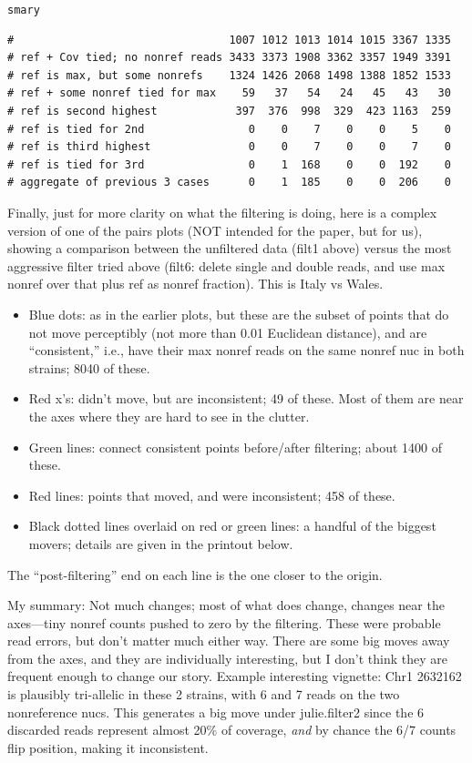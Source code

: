 \documentclass{article}\usepackage[]{graphicx}\usepackage[]{color}
\makeatletter
\newcommand{\hlstd}[1]{\textcolor[rgb]{0.345,0.345,0.345}{#1}}%
\newenvironment{kframe}{%
 \def\at@end@of@kframe{}%
 \ifinner\ifhmode%
  \def\at@end@of@kframe{\end{minipage}}%
  \begin{minipage}{\columnwidth}%
 \fi\fi%
 \def\FrameCommand##1{\hskip\@totalleftmargin \hskip-\fboxsep
 \colorbox{shadecolor}{##1}\hskip-\fboxsep
     \hskip-\linewidth \hskip-\@totalleftmargin \hskip\columnwidth}%
 \MakeFramed {\advance\hsize-\width
   \@totalleftmargin\z@ \linewidth\hsize
   \@setminipage}}%
 {\par\unskip\endMakeFramed%
 \at@end@of@kframe}
\newenvironment{knitrout}{}{} %
\makeatother
\begin{document}
\begin{knitrout}
\begin{kframe}
\begin{alltt}
\hlstd{smary}
\end{alltt}
\begin{verbatim}
#                                 1007 1012 1013 1014 1015 3367 1335
# ref + Cov tied; no nonref reads 3433 3373 1908 3362 3357 1949 3391
# ref is max, but some nonrefs    1324 1426 2068 1498 1388 1852 1533
# ref + some nonref tied for max    59   37   54   24   45   43   30
# ref is second highest            397  376  998  329  423 1163  259
# ref is tied for 2nd                0    0    7    0    0    5    0
# ref is third highest               0    0    7    0    0    7    0
# ref is tied for 3rd                0    1  168    0    0  192    0
# aggregate of previous 3 cases      0    1  185    0    0  206    0
\end{verbatim}
\end{kframe}
\end{knitrout}


Finally, just for more clarity on what the filtering is doing, here is a complex version of one of the pairs plots (NOT intended for the paper, but for us), showing a comparison between the unfiltered data (filt1 above) versus the most aggressive filter tried above (filt6: delete single and double reads, and use max nonref over that plus ref as nonref fraction).  This is Italy vs Wales.  
\begin{itemize}
  \item Blue dots: as in the earlier plots, but these are the subset of points that do not move perceptibly (not more than 0.01 Euclidean distance), and are ``consistent,'' i.e., have their max nonref reads on the same nonref nuc in both strains; 8040 of these.  
  \item Red x's: didn't move, but are inconsistent; 49 of these.  Most of them are near the axes where they are hard to see in the clutter.  
  \item Green lines: connect consistent points before/after filtering; about 1400 of these.  
  \item Red lines: points that moved, and were inconsistent; 458 of these.  
  \item Black dotted lines overlaid on red or green lines: a handful of the biggest movers; details are given in the printout below.
\end{itemize}
The ``post-filtering'' end on each line is the one closer to the origin.  

My summary: Not much changes; most of what does change, changes near the axes---tiny nonref counts pushed to zero by the filtering.  These were probable read errors, but don't matter much either way.  There are some big moves away from the axes, and they are individually interesting, but I don't think they are frequent enough to change our story.  Example interesting vignette: Chr1 2632162 is plausibly tri-allelic in these 2 strains, with 6 and 7 reads on the two nonreference nucs.  This generates a big move under julie.filter2 since the 6 discarded reads represent almost 20\% of coverage, \emph{and} by chance the 6/7 counts flip position, making it inconsistent.
\end{document}
